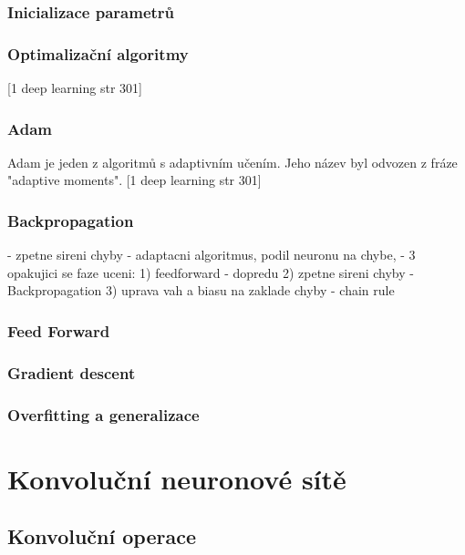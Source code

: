 \subsection{Inicializace parametrů}


\subsection*{Optimalizační algoritmy}
 [1 deep learning str 301]
\subsection*{Adam}
Adam je jeden z algoritmů s adaptivním učením. Jeho název byl odvozen z fráze "adaptive moments".  [1 deep learning str 301]


\subsection{Backpropagation}
- zpetne sireni chyby
- adaptacni algoritmus, podil neuronu na chybe,
- 3 opakujici se faze uceni:
1) feedforward - dopredu
2) zpetne sireni chyby - Backpropagation
3) uprava vah a biasu na zaklade chyby
- chain rule

\subsection*{Feed Forward}

\subsection*{Gradient descent}

\subsection{Overfitting a generalizace}



\chapter{Konvoluční neuronové sítě}
\label{konvolucni-site}

\section{Konvoluční operace}





